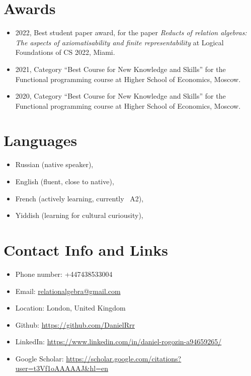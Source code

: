 \documentclass[11pt,a4paper]{article}
\begin{document}
\section{Awards}

\begin{itemize}[leftmargin=*]
    \item 2022, Best student paper award, for the paper \textit{Reducts of relation algebras: The aspects of axiomatisability and finite representability} at Logical Foundations of CS 2022, Miami.
    \item 2021, Category ``Best Course for New Knowledge and Skills'' for the Functional programming course at Higher School of Economics, Moscow.
    \item 2020, Category ``Best Course for New Knowledge and Skills'' for the Functional programming course at Higher School of Economics, Moscow.
\end{itemize}

\section{Languages}

\begin{itemize}
    \item Russian (native speaker),
    \item English (fluent, close to native),
    \item French (actively learning, currently ~A2),
    \item Yiddish (learning for cultural curiousity),
\end{itemize}

\section{Contact Info and Links}

\begin{itemize}[leftmargin=*]
    \item Phone number: +447438533004
    \item Email: \href{mailto:relationalgebra@gmail.com}{relationalgebra@gmail.com}
    \item Location: London, United Kingdom
    \item Github: \url{https://github.com/DanielRrr}
    \item LinkedIn: \url{https://www.linkedin.com/in/daniel-rogozin-a94659265/}
    \item Google Scholar: \url{https://scholar.google.com/citations?user=t3Vf1oAAAAAJ&hl=en}
\end{itemize}
\end{document}
